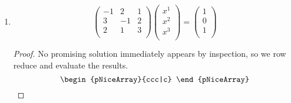 \documentclass[../psets.tex]{subfiles}
\begin{document}
\begin{enumerate}
\begin{enumerate}
\begin{proof}
\begin{equation*}
                \cong
                \begin{pNiceArray}{ccc|c}
                    1 & 0 & 1 & 1\\
                    0 & 1 & 1 & 1\\
                    0 & 0 & 0 & 0
                \end{pNiceArray}
            \end{equation*}
            Therefore, the family of solutions is given by
            \begin{equation*}
                \boxed{
                    x =
                    \begin{pmatrix}
                        1-x^3\\
                        1-x^3\\
                        x^3\\
                    \end{pmatrix}
                }
            \end{equation*}
            for $x^3\in\R$.
        \end{proof}
        \item 
        \begin{equation*}
            \begin{pmatrix}
                -1 & 2 & 1\\
                3 & -1 & 2\\
                2 & 1 & 3\\
            \end{pmatrix}
            \begin{pmatrix}
                x^1\\
                x^2\\
                x^3\\
            \end{pmatrix}
            =
            \begin{pmatrix}
                1\\
                0\\
                1\\
            \end{pmatrix}
        \end{equation*}
        \begin{proof}
            No promising solution immediately appears by inspection, so we row reduce and evaluate the results.
            \begin{equation*}
                \begin{pNiceArray}{ccc|c}

\end{pNiceArray}
\end{equation*}
\end{proof}
\end{enumerate}
\end{enumerate}
\end{document}
